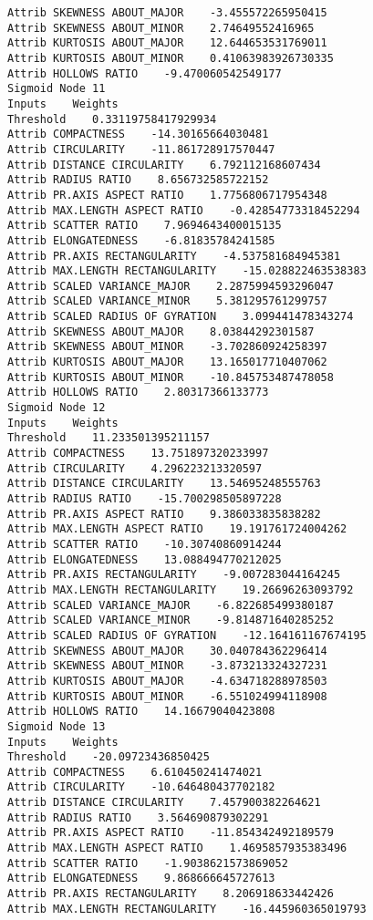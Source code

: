 \documentclass[
	article,			%
	11pt,				%
	oneside,			%
	a4paper,			%
	english,			%
	brazil,				%
	sumario=tradicional
	]{abntex2}
\begin{document}
\begin{lstlisting}
Attrib SKEWNESS ABOUT_MAJOR    -3.455572265950415
Attrib SKEWNESS ABOUT_MINOR    2.74649552416965
Attrib KURTOSIS ABOUT_MAJOR    12.644653531769011
Attrib KURTOSIS ABOUT_MINOR    0.41063983926730335
Attrib HOLLOWS RATIO    -9.470060542549177
Sigmoid Node 11
Inputs    Weights
Threshold    0.33119758417929934
Attrib COMPACTNESS    -14.30165664030481
Attrib CIRCULARITY    -11.861728917570447
Attrib DISTANCE CIRCULARITY    6.792112168607434
Attrib RADIUS RATIO    8.656732585722152
Attrib PR.AXIS ASPECT RATIO    1.7756806717954348
Attrib MAX.LENGTH ASPECT RATIO    -0.42854773318452294
Attrib SCATTER RATIO    7.9694643400015135
Attrib ELONGATEDNESS    -6.81835784241585
Attrib PR.AXIS RECTANGULARITY    -4.537581684945381
Attrib MAX.LENGTH RECTANGULARITY    -15.028822463538383
Attrib SCALED VARIANCE_MAJOR    2.2875994593296047
Attrib SCALED VARIANCE_MINOR    5.381295761299757
Attrib SCALED RADIUS OF GYRATION    3.099441478343274
Attrib SKEWNESS ABOUT_MAJOR    8.03844292301587
Attrib SKEWNESS ABOUT_MINOR    -3.702860924258397
Attrib KURTOSIS ABOUT_MAJOR    13.165017710407062
Attrib KURTOSIS ABOUT_MINOR    -10.845753487478058
Attrib HOLLOWS RATIO    2.80317366133773
Sigmoid Node 12
Inputs    Weights
Threshold    11.233501395211157
Attrib COMPACTNESS    13.751897320233997
Attrib CIRCULARITY    4.296223213320597
Attrib DISTANCE CIRCULARITY    13.54695248555763
Attrib RADIUS RATIO    -15.700298505897228
Attrib PR.AXIS ASPECT RATIO    9.386033835838282
Attrib MAX.LENGTH ASPECT RATIO    19.191761724004262
Attrib SCATTER RATIO    -10.30740860914244
Attrib ELONGATEDNESS    13.088494770212025
Attrib PR.AXIS RECTANGULARITY    -9.007283044164245
Attrib MAX.LENGTH RECTANGULARITY    19.26696263093792
Attrib SCALED VARIANCE_MAJOR    -6.822685499380187
Attrib SCALED VARIANCE_MINOR    -9.814871640285252
Attrib SCALED RADIUS OF GYRATION    -12.164161167674195
Attrib SKEWNESS ABOUT_MAJOR    30.040784362296414
Attrib SKEWNESS ABOUT_MINOR    -3.873213324327231
Attrib KURTOSIS ABOUT_MAJOR    -4.634718288978503
Attrib KURTOSIS ABOUT_MINOR    -6.551024994118908
Attrib HOLLOWS RATIO    14.16679040423808
Sigmoid Node 13
Inputs    Weights
Threshold    -20.09723436850425
Attrib COMPACTNESS    6.610450241474021
Attrib CIRCULARITY    -10.646480437702182
Attrib DISTANCE CIRCULARITY    7.457900382264621
Attrib RADIUS RATIO    3.564690879302291
Attrib PR.AXIS ASPECT RATIO    -11.854342492189579
Attrib MAX.LENGTH ASPECT RATIO    1.4695857935383496
Attrib SCATTER RATIO    -1.9038621573869052
Attrib ELONGATEDNESS    9.868666645727613
Attrib PR.AXIS RECTANGULARITY    8.206918633442426
Attrib MAX.LENGTH RECTANGULARITY    -16.445960365019793

\end{lstlisting}
\end{document}
